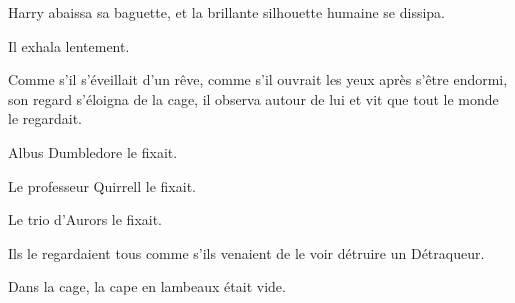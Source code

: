 Harry abaissa sa baguette, et la brillante silhouette humaine se dissipa.

Il exhala lentement.

Comme s'il s'éveillait d'un rêve, comme s'il ouvrait les yeux après s'être endormi, son regard s'éloigna de la cage, il observa autour de lui et vit que tout le monde le regardait.

Albus Dumbledore le fixait.

Le professeur Quirrell le fixait.

Le trio d'Aurors le fixait.

Ils le regardaient tous comme s'ils venaient de le voir détruire un Détraqueur.

Dans la cage, la cape en lambeaux était vide.

